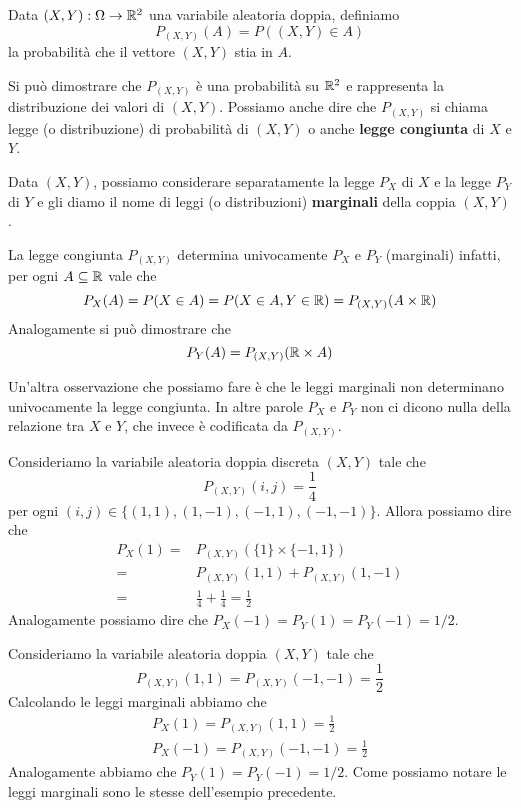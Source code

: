\begin{definition}
	Data $(X, Y) : \Omega \to \mathbb{R}^2$ una variabile aleatoria doppia, definiamo
	\[ P_{(X, Y)} (A) = P((X, Y) \in A) \]
	la probabilità che il vettore $(X, Y)$ stia in $A$.
\end{definition}

Si può dimostrare che $P_{(X,Y)}$ è una probabilità su $\mathbb{R}^2$ e rappresenta la distribuzione dei
valori di $(X, Y)$. Possiamo anche dire che $P_{(X, Y)}$ si chiama legge (o distribuzione) di
probabilità di $(X,Y)$ o anche \textbf{legge congiunta} di $X$ e $Y$.

Data $(X, Y)$, possiamo considerare separatamente la legge $P_X$ di $X$ e la legge $P_Y$ di $Y$ e
gli diamo il nome di leggi (o distribuzioni) \textbf{marginali} della coppia $(X,Y)$.

\begin{observation}
	La legge congiunta $P_{(X,Y)}$ determina univocamente $P_X$ e $P_Y$ (marginali) infatti, per
	ogni $A \subseteq \mathbb{R}$ vale che
	\[ P_X(A) = P(X \in A) = P(X \in A, Y \in \mathbb{R}) = P_{(X,Y)} (A \times \mathbb{R}) \]
	Analogamente si può dimostrare che
	\[ P_Y(A) = P_{(X,Y)} (\mathbb{R} \times A) \]
\end{observation}

Un'altra osservazione che possiamo fare è che le leggi marginali non determinano univocamente la
legge congiunta. In altre parole $P_X$ e $P_Y$ non ci dicono nulla della relazione tra $X$ e $Y$,
che invece è codificata da $P_{(X,Y)}$.

\begin{example}
	Consideriamo la variabile aleatoria doppia discreta $(X, Y)$ tale che
	\[ P_{(X, Y)} (i,j) = \frac{1}{4} \]
	per ogni $(i,j) \in \{ (1,1), (1,-1), (-1,1), (-1,-1) \}$. Allora possiamo dire che
	\begin{align*}
		P_X(1) = & P_{(X, Y)} (\{ 1 \} \times \{-1, 1\})   \\
		=        & P_{(X,Y)} (1,1) + P_{(X,Y)} (1,-1)      \\
		=        & \frac{1}{4} + \frac{1}{4} = \frac{1}{2}
	\end{align*}
	Analogamente possiamo dire che $P_X(-1) = P_Y(1) = P_Y(-1) = 1/2$.
\end{example}

\begin{example}
	Consideriamo la variabile aleatoria doppia $(X, Y)$ tale che
	\[ P_{(X,Y)} (1,1) = P_{(X, Y)} (-1, -1) = \frac{1}{2} \]
	Calcolando le leggi marginali abbiamo che
	\begin{gather*}
		P_X (1) = P_{(X, Y)} (1, 1) = \frac{1}{2} \\
		P_X (-1) = P_{(X, Y)} (-1, -1) = \frac{1}{2}
	\end{gather*}
	Analogamente abbiamo che $P_Y(1) = P_Y(-1) = 1/2$. Come possiamo notare le leggi marginali sono
	le stesse dell'esempio precedente.
\end{example}

